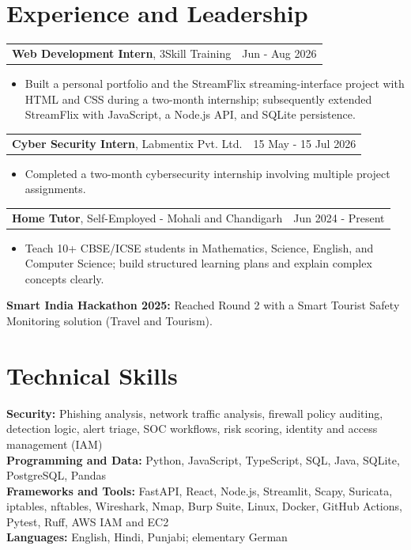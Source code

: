 \documentclass[10pt,letterpaper]{article}
\newenvironment{resumeitems}{
  \begin{itemize}[
    leftmargin=13pt,
    label=\textbullet,
    itemsep=0.5pt,
    parsep=0pt,
    topsep=1.5pt,
    partopsep=0pt
  ]
}{
  \end{itemize}
}
\begin{document}
\section{Experience and Leadership}
\begin{tabularx}{\linewidth}{@{}Xr@{}}
  \textbf{Web Development Intern}, 3Skill Training & Jun - Aug 2026\\
\end{tabularx}
\begin{resumeitems}
  \item Built a personal portfolio and the StreamFlix streaming-interface project with HTML and CSS during a two-month internship; subsequently extended StreamFlix with JavaScript, a Node.js API, and SQLite persistence.
\end{resumeitems}
\vspace{-1pt}
\begin{tabularx}{\linewidth}{@{}Xr@{}}
  \textbf{Cyber Security Intern}, Labmentix Pvt. Ltd. & 15 May - 15 Jul 2026\\
\end{tabularx}
\begin{resumeitems}
  \item Completed a two-month cybersecurity internship involving multiple project assignments.
\end{resumeitems}
\vspace{-1pt}
\begin{tabularx}{\linewidth}{@{}Xr@{}}
  \textbf{Home Tutor}, Self-Employed - Mohali and Chandigarh & Jun 2024 - Present\\
\end{tabularx}
\begin{resumeitems}
  \item Teach 10+ CBSE/ICSE students in Mathematics, Science, English, and Computer Science; build structured learning plans and explain complex concepts clearly.
\end{resumeitems}
\vspace{-1pt}
\textbf{Smart India Hackathon 2025:} Reached Round 2 with a Smart Tourist Safety Monitoring solution (Travel and Tourism).

\section{Technical Skills}
\small
\textbf{Security:} Phishing analysis, network traffic analysis, firewall policy auditing, detection logic, alert triage, SOC workflows, risk scoring, identity and access management (IAM)\\
\textbf{Programming and Data:} Python, JavaScript, TypeScript, SQL, Java, SQLite, PostgreSQL, Pandas\\
\textbf{Frameworks and Tools:} FastAPI, React, Node.js, Streamlit, Scapy, Suricata, iptables, nftables, Wireshark, Nmap, Burp Suite, Linux, Docker, GitHub Actions, Pytest, Ruff, AWS IAM and EC2\\
\textbf{Languages:} English, Hindi, Punjabi; elementary German
\end{document}

